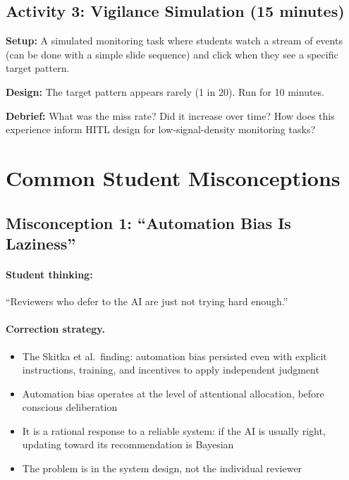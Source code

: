 \subsection{Activity 3: Vigilance Simulation (15 minutes)}

\textbf{Setup:} A simulated monitoring task where students watch a stream of events (can be done with a simple slide sequence) and click when they see a specific target pattern.

\textbf{Design:} The target pattern appears rarely (1 in 20). Run for 10 minutes.

\textbf{Debrief:} What was the miss rate? Did it increase over time? How does this experience inform HITL design for low-signal-density monitoring tasks?

\section{Common Student Misconceptions}

\subsection{Misconception 1: ``Automation Bias Is Laziness''}

\paragraph{Student thinking:} ``Reviewers who defer to the AI are just not trying hard enough.''

\paragraph{Correction strategy.}
\begin{itemize}
    \item The Skitka et al.\ finding: automation bias persisted even with explicit instructions, training, and incentives to apply independent judgment
    \item Automation bias operates at the level of attentional allocation, before conscious deliberation
    \item It is a rational response to a reliable system: if the AI is usually right, updating toward its recommendation is Bayesian
    \item The problem is in the system design, not the individual reviewer
\end{itemize}

